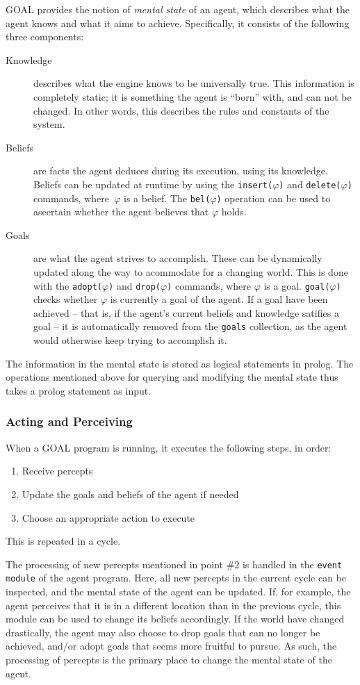 GOAL provides the notion of \emph{mental state} of an agent, which
describes what the agent knows and what it aims to achieve. Specifically,
it consists of the following three components:
\begin{description}
\item [{Knowledge}] describes what the engine knows to be universally true.
This information is completely static; it is something the agent is
``born'' with, and can not be changed. In other words, this describes
the rules and constants of the system.
\item [{Beliefs}] are facts the agent deduces during its execution, using
its knowledge. Beliefs can be updated at runtime by using the \texttt{insert($\varphi$)}
and \texttt{delete($\varphi$)} commands, where\texttt{ $\varphi$}
is a belief. The \texttt{bel($\varphi$)} operation can be used to
ascertain whether the agent believes that $\varphi$ holds.
\item [{Goals}] are what the agent strives to accomplish. These can be
dynamically updated along the way to acommodate for a changing world.
This is done with the \texttt{adopt($\varphi$)} and \texttt{drop($\varphi$)}
commands, where $\varphi$ is a goal. \texttt{goal($\varphi$)} checks
whether $\varphi$ is currently a goal of the agent. If a goal have
been achieved -- that is, if the agent's current beliefs and knowledge
satifies a goal -- it is automatically removed from the \texttt{goals}
collection, as the agent would otherwise keep trying to accomplish
it. 
\end{description}
The information in the mental state is stored as logical statements
in prolog. The operations mentioned above for querying and modifying
the mental state thus takes a prolog statement as input.


\subsubsection*{Acting and Perceiving}

When a GOAL program is running, it executes the following steps, in
order:
\begin{enumerate}
\item Receive percepts
\item Update the goals and beliefs of the agent if needed
\item Choose an appropriate action to execute
\end{enumerate}
This is repeated in a cycle. 

The processing of new percepts mentioned in point \#2 is handled in
the \texttt{event module} of the agent program. Here, all new percepts
in the current cycle can be inspected, and the mental state of the
agent can be updated. If, for example, the agent perceives that it
is in a different location than in the previous cycle, this module
can be used to change its beliefs accordingly. If the world have changed
drastically, the agent may also choose to drop goals that can no longer
be achieved, and/or adopt goals that seems more fruitful to pursue.
As such, the processing of percepts is the primary place to change
the mental state of the agent.

